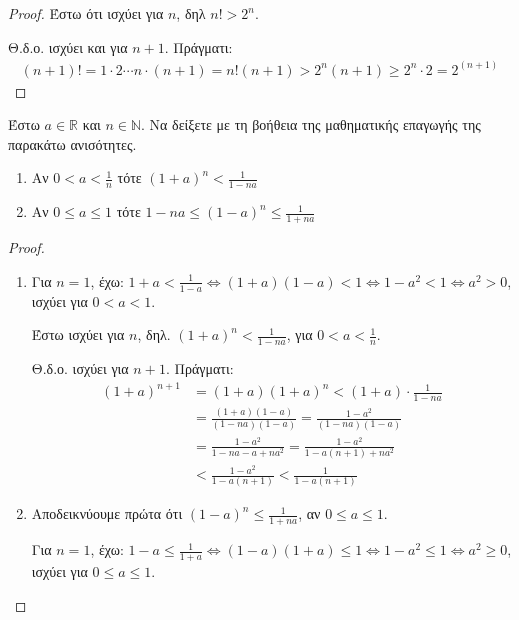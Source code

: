 \begin{multicols}{2}
\begin{enumerate}
\begin{proof}
      Έστω ότι ισχύει για $n$, δηλ $ n! >2^{n} $. 

      Θ.δ.ο. ισχύει και για $ n+1 $. Πράγματι:
      \begin{align*} (n+1)! = 1 \cdot 2 \cdots n \cdot (n+1)  
        =n!(n+1) > 2^{n}(n+1) \geq 2^{n}\cdot 2 = 2^{(n+1)}
      \end{align*}
    \end{proof}

  \item \textcolor{Col1}{Έστω $ a \in \mathbb{R} $ και $ n \in \mathbb{N}$.
      Να δείξετε με τη βοήθεια της μαθηματικής επαγωγής της 
      παρακάτω ανισότητες.
      \begin{enumerate}
        \item Αν $ 0<a< \frac{1}{n} $ τότε $ (1+a)^{n} < \frac{1}{1-na} $
        \item Αν $ 0 \leq a \leq 1$  τότε $ 1-na \leq (1-a)^{n} \leq
          \frac{1}{1+na} $
    \end{enumerate}}
    \begin{proof}
    \item {}
      \begin{enumerate}
        \item Για $ n=1 $, έχω: $ 1+a < \frac{1}{1-a} 
          \Leftrightarrow (1+a)(1-a) < 1 
          \Leftrightarrow 1-a^{2} <1 \Leftrightarrow a^{2} > 0  $,
          ισχύει για $ 0<a<1 $.

          Έστω ισχύει για $ n $, δηλ. $ (1+a)^{n} < \frac{1}{1-na}
          $, για $ 0 < a < \frac{1}{n} $.

          Θ.δ.ο. ισχύει για $ n+1 $. Πράγματι:
          \begin{align*}
            (1+a)^{n+1} 
            &= (1+a)(1+a)^{n} < (1+a)\cdot \frac{1}{1-na} \\
            &= \frac{(1+a)(1-a)}{(1-na)(1-a)}= \frac{1-a^{2}}{(1-na)(1-a)} \\ 
            &= \frac{1-a^{2}}{1-na-a+na^{2}} = \frac{1-a^{2}}{1-a(n+1)+na^{2}} \\
            &< \frac{1-a^{2}}{1-a(n+1)} < \frac{1}{1-a(n+1)} 
          \end{align*}
        \item Αποδεικνύουμε πρώτα ότι $ (1-a)^{n} \leq \frac{1}{1+na}$,
          αν $ 0 \leq a \leq 1 $.

          Για $ n=1 $, έχω: $ 1-a \leq \frac{1}{1+a} 
          \Leftrightarrow (1-a)(1+a) \leq 1 \Leftrightarrow 
          1-a^{2} \leq 1 \Leftrightarrow a^{2} \geq 0  $, ισχύει
          για $ 0 \leq a \leq 1 $. 


\end{enumerate}
\end{proof}
\end{enumerate}
\end{multicols}
